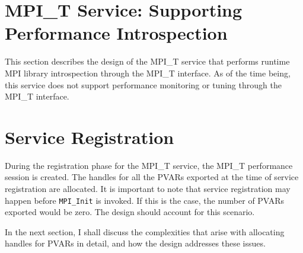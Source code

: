 \section {MPI\_T Service: Supporting Performance Introspection}
This section describes the design of the MPI\_T service that performs runtime MPI library introspection through the MPI\_T interface. As of the time being, this service does not support performance monitoring or tuning through the MPI\_T interface. 
\section{Service Registration}
During the registration phase for the MPI\_T service, the MPI\_T performance session is created. The handles for all the PVARs exported at the time of service registration are allocated. It is important to note that service registration may happen before \verb+MPI_Init+ is invoked. If this is the case, the number of PVARs exported would be zero. The design should account for this scenario.
\par In the next section, I shall discuss the complexities that arise with allocating handles for PVARs in detail, and how the design addresses these issues.
